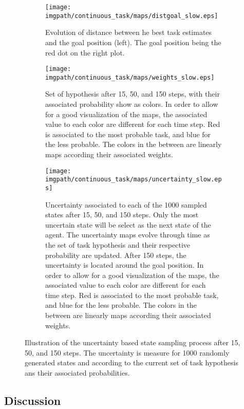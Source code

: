 \begin{figure}[!ht]
\centering
    \begin{subfigure}[b]{\columnwidth}
        \centering
        \texttt{[image: \\imgpath/continuous\_task/maps/distgoal\_slow.eps]}
        \caption{Evolution of distance between he best task estimates and the goal position (left). The goal position being the red dot on the right plot.}
        \label{fig:continuoustaskexampleslowdist}
    \end{subfigure}
    \begin{subfigure}[b]{\columnwidth}
        \centering
        \texttt{[image: \\imgpath/continuous\_task/maps/weights\_slow.eps]}
        \caption{Set of hypothesis after 15, 50, and 150 steps, with their associated probability show as colors. In order to allow for a good visualization of the maps, the associated value to each color are different for each time step. Red is associated to the most probable task, and blue for the less probable. The colors in the between are linearly maps according their associated weights.}
        \label{fig:continuoustaskexampleslowweights}
    \end{subfigure}
    \begin{subfigure}[b]{\columnwidth}
        \centering
        \texttt{[image: \\imgpath/continuous\_task/maps/uncertainty\_slow.eps]}
        \caption{Uncertainty associated to each of the 1000 sampled states after 15, 50, and 150 steps. Only the most uncertain state will be select as the next state of the agent. The uncertainty maps evolve through time as the set of task hypothesis and their respective probability are updated. After 150 steps, the uncertainty is located around the goal position. In order to allow for a good visualization of the maps, the associated value to each color are different for each time step. Red is associated to the most probable task, and blue for the less probable. The colors in the between are linearly maps according their associated weights.}
        \label{fig:continuoustaskexampleslowuncertainty}
    \end{subfigure}
\caption{Illustration of the uncertainty based state sampling process after 15, 50, and 150 steps. The uncertainty is measure for 1000 randomly generated states and according to the current set of task hypothesis ans their associated probabilities.}
\label{fig:continuoustasktasksamplingexampleslow}
\end{figure}

\subsection{Discussion}




